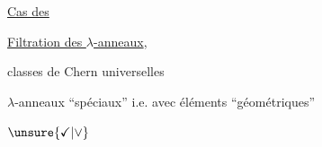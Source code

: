 \uline{Cas des }

\uline{Filtration des $\lambda$-anneaux},

classes de Chern universelles

$\lambda$-anneaux ``spéciaux'' i.e. avec éléments ``géométriques''

\quad $\unsure{\checkmark|\vee}$
